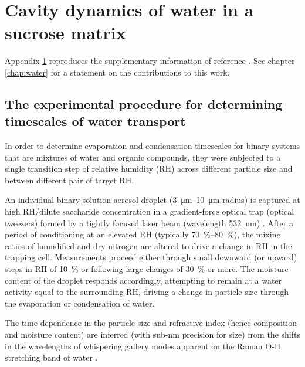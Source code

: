 %
%

\chapter{Cavity dynamics of water in a sucrose matrix}\label{app:wat}
Appendix \ref{app:wat} reproduces the supplementary information of reference \cite{songTransientCavityDynamics2020a}. See chapter \ref{chap:water} for a statement on the contributions to this work. 

\section{The experimental procedure for determining timescales of water transport}

In order to determine evaporation and condensation timescales for binary systems that are mixtures of water and organic compounds, they were subjected to a single transition step of relative humidity (RH) across different particle size and between different pair of target RH. 

An individual binary solution aerosol droplet (\SIrange[range-phrase=\text{--}]{3}{10}{\micro\meter} radius) is captured at high RH/dilute saccharide concentration in a gradient-force optical trap (optical tweezers) formed by a tightly focused laser beam (wavelength \SI{532}{\nano\meter}) \cite{powerProbingMicrorheologicalProperties2014, Song2016a}. After a period of conditioning at an elevated RH (typically \SIrange[range-phrase=\text{--}]{70}{80}{\percent}), the mixing ratios of humidified and dry nitrogen are altered to drive a change in RH in the trapping cell. Measurements proceed either through small downward (or upward) steps in RH of \SI{10}{\percent} or following large changes of \SI{30}{\percent} or more. The moisture content of the droplet responds accordingly, attempting to remain at a water activity equal to the surrounding RH, driving a change in particle size through the evaporation or condensation of water. 

The time-dependence in the particle size and refractive index (hence composition and moisture content) are inferred (with sub-\si{\nano\meter} precision for size) from the shifts in the wavelengths of whispering gallery modes apparent on the Raman O-H stretching band of water \cite{prestonAccurateEfficientDetermination2013,reidSpectroscopicStudiesSize2007,reidLaserProbingSingleaerosol2006}.

